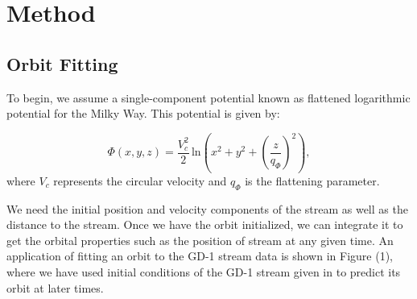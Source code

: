 \documentclass[preprint]{aastex}
\begin{document}
\section{Method} \label{label:methodsection}

\subsection{Orbit Fitting}
To begin, we assume a single-component potential known as flattened logarithmic potential for the Milky Way. This potential is given by:

\begin{equation} \label{eq:logPotential}
\Phi(x,y,z) = \frac{V_c^2}{2} \, \mathrm{ln} \left ({x}^2 + y^2 + \left ( \frac{z}{q_{\Phi}}\right )^2 \right ),
\end{equation}
where $V_c$ represents the circular velocity and $q_{\Phi}$ is the flattening parameter. 

We need the initial position and velocity components of the stream as well as the distance to the stream. Once we have the orbit initialized, we can integrate it to get the orbital properties such as the position of stream at any given time. An application of fitting an orbit to the GD-1 stream data is shown in Figure (1), where we have used initial conditions of the GD-1 stream given in \citet{koposov} to predict its orbit at later times.
\end{document}
